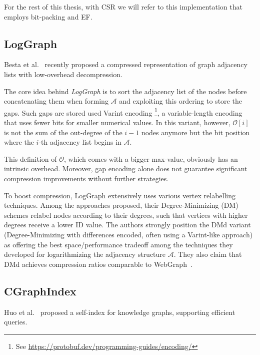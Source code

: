 For the rest of this thesis, with CSR we will refer to this implementation that employs bit-packing and EF.


\subsection{LogGraph}
Besta et al.~\cite{loggraph} recently proposed a compressed representation of graph adjacency lists with low-overhead decompression.

The core idea behind \emph{LogGraph} is to sort the adjacency list of the nodes before concatenating them when forming $\mathcal{A}$ and exploiting this ordering to store the gaps. Such gaps are stored used Varint encoding \footnote{See \url{https://protobuf.dev/programming-guides/encoding/}}, a variable-length encoding that uses fewer bits for smaller numerical values. In this variant, however, $\mathcal{O}[i]$ is not the sum of the out-degree of the $i - 1$ nodes anymore but the bit position where the $i$-th adjacency list begins in $\mathcal{A}$.

This definition of $\mathcal{O}$, which comes with a bigger max-value, obviously has an intrinsic overhead. Moreover, gap encoding alone does not guarantee significant compression improvements without further strategies.

To boost compression, LogGraph extensively uses various vertex relabelling techniques. Among the approaches proposed, their Degree-Minimizing (DM) schemes relabel nodes according to their degrees, such that vertices with higher degrees receive a lower ID value. The authors strongly position the DMd variant (Degree-Minimizing with differences encoded, often using a Varint-like approach) as offering the best space/performance tradeoff among the techniques they developed for logarithmizing the adjacency structure $\mathcal A$. They also claim that DMd achieves compression ratios comparable to WebGraph~\cite{webgraph}.

\subsection{CGraphIndex}

Huo et al.~\cite{CGraphIndex} proposed a self-index for knowledge graphs, supporting efficient queries.

